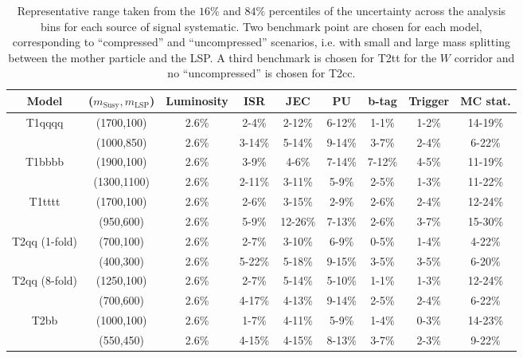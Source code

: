 \begin{table}[h!]
    \scriptsize
    \caption{
        Representative range taken from the $16\%$ and $84\%$ percentiles of the
        uncertainty across the analysis bins for each source of signal
        systematic. Two benchmark point are chosen for each model, corresponding
        to ``compressed'' and ``uncompressed'' scenarios, i.e. with small and
        large mass splitting between the mother particle and the LSP. A third
        benchmark is chosen for T2tt for the $W$ corridor and no
        ``uncompressed'' is chosen for T2cc.
    }
    \label{tab:sig-systematics}
    \centering
    \begin{tabular}{ ccccccccc }
        \hline \hline
        Model & ($m_{\mathrm{Susy}},m_{\mathrm{LSP}}$) & Luminosity & ISR & JEC & PU & b-tag & Trigger & MC stat. \\ \hline
        \multirow{2}{*}{T1qqqq}
            & (1700,100) & 2.6\% & 2-4\%  & 2-12\% & 6-12\% & 1-1\% & 1-2\% & 14-19\% \\
            & (1000,850) & 2.6\% & 3-14\% & 5-14\% & 9-14\% & 3-7\% & 2-4\% & 6-22\%  \\
        \hline
        \multirow{2}{*}{T1bbbb}
            & (1900,100)  & 2.6\% & 3-9\%  & 4-6\%  & 7-14\% & 7-12\% & 4-5\% & 11-19\% \\
            & (1300,1100) & 2.6\% & 2-11\% & 3-11\% & 5-9\%  & 2-5\%  & 1-3\% & 11-22\% \\
        \hline
        \multirow{2}{*}{T1tttt}
            & (1700,100) & 2.6\% & 2-6\% & 3-15\%  & 2-9\%  & 2-6\% & 2-4\% & 12-24\% \\
            & (950,600)  & 2.6\% & 5-9\% & 12-26\% & 7-13\% & 2-6\% & 3-7\% & 15-30\% \\
        \hline
        \multirow{2}{*}{T2qq (1-fold)}
            & (700,100) & 2.6\% & 2-7\%  & 3-10\% & 6-9\%  & 0-5\% & 1-4\% & 4-22\% \\
            & (400,300) & 2.6\% & 5-22\% & 5-18\% & 9-15\% & 3-5\% & 3-5\% & 6-20\% \\
        \hline
        \multirow{2}{*}{T2qq (8-fold)}
            & (1250,100) & 2.6\% & 2-7\%  & 5-14\% & 5-10\% & 1-1\% & 1-3\% & 12-24\% \\
            & (700,600)  & 2.6\% & 4-17\% & 4-13\% & 9-14\% & 2-5\% & 2-4\% & 6-22\%  \\
        \hline
        \multirow{2}{*}{T2bb}
            & (1000,100) & 2.6\% & 1-7\%  & 4-11\% & 5-9\%  & 1-4\% & 0-3\% & 14-23\% \\
            & (550,450)  & 2.6\% & 4-15\% & 4-15\% & 8-13\% & 3-7\% & 2-3\% & 9-22\%  \\ 

\end{tabular}
\end{table}

